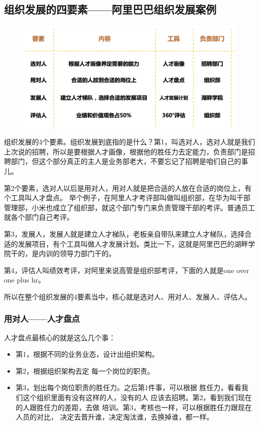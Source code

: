 \documentclass[12pt]{article}
\begin{document}
\subsection{组织发展的四要素——阿里巴巴组织发展案例}
\begin{figure}[H]
    \centering
    \includegraphics[width=1\textwidth]{fig/Ali_Performance_14.png}
\end{figure}

组织发展的4个要素。组织发展到底指的是什么？第1，叫选对人，选对人就是我们上次说的招聘，所以是要根据人才画像，根据他的胜任力去定能力，负责部门是招聘部门，但这个部分真正的主人是业务部老大，不要忘记了招聘是咱们自己的事儿。

第2个要素，选对人以后是用对人，用对人就是把合适的人放在合适的岗位上，有个工具叫人才盘点。 举个例子，在阿里人才考评部叫做叫组织部，在华为叫干部管理部，小米也成立了组织部，就这个部门专门来负责管理干部的考评。普通员工就各个部门自己考评。

第3，发展人，发展人就是建立人才梯队，老板亲自带队来建立人才梯队，选择合适的发展项目，有个工具叫做人才发展计划。类比一下，这就是阿里巴巴的湖畔学院干的，是内训的领导力部门干的。

第4，评估人叫绩效考评，对阿里来说高管是组织部考评，下面的人就是one over one plus hr。

所以在整个组织发展的4要素当中，核心就是选对人、用对人、发展人、评估人。

\subsubsection{用对人——人才盘点}
人才盘点最核心的就是这么几个事：
\begin{itemize}
\setlength{\itemsep}{0pt}
\setlength{\parsep}{0pt}
\setlength{\parskip}{0pt}
    \item 第1，根据不同的业务业态，设计出组织架构。
    \item 第2，根据组织架构去定 每一个岗位的职责。
    \item 第3，划出每个岗位职责的胜任力。之后第1件事，可以根据 胜任力，看看我们这个组织里面有没有这样的人，没有的人 应该去招聘。第2，看到我们现在的人跟胜任力的差距，去做 培训。第3，考核也一样，可以根据胜任力跟现在人员的对比， 决定去晋升谁，决定淘汰谁，去换掉谁，都一样。
\end{itemize}
\end{document}
